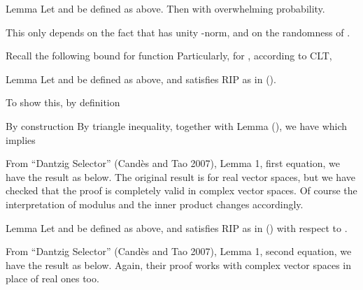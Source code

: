 \Result
{Lemma}
{
Let  and  be defined as above.
Then
%
%
with overwhelming probability.
}

This only depends on the fact that  has unity -norm, and on the randomness of .

Recall the following bound for  function
Particularly, for , according to CLT,

\color[red]{(To be done)}

\Result
{Lemma}
{
Let  and  be defined as above, and  satisfies RIP as in ().
%
}

To show this, by definition
%

By construction
By triangle inequality, together with Lemma (), we have
which implies

From ``Dantzig Selector'' (Cand\`es and Tao 2007), Lemma 1, first equation, we have the result as below.
The original result is for real vector spaces, but we have checked that the proof is completely valid in complex vector spaces.
Of course the interpretation of modulus and the inner product changes accordingly.


\Result
{Lemma}
{
Let  and  be defined as above, and  satisfies RIP as in () with respect to .
%
%
}

From ``Dantzig Selector'' (Cand\`es and Tao 2007), Lemma 1, second equation, we have the result as below.
Again, their proof works with complex vector spaces in place of real ones too.

